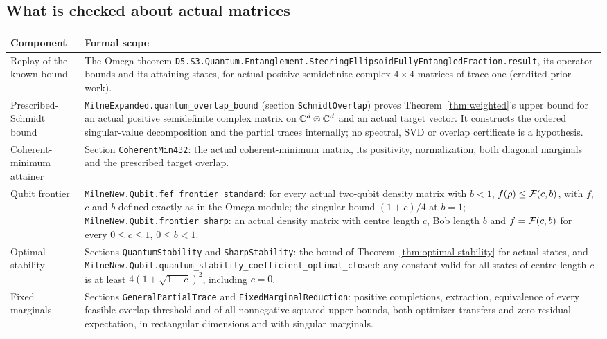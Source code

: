 \subsection{What is checked about actual matrices}
\begin{center}\small
\begin{longtable}{p{}p{}}
\toprule
Component & Formal scope\\\midrule\endhead
Replay of the known bound & The Omega theorem
\nolinkurl{D5.S3.Quantum.Entanglement.SteeringEllipsoidFullyEntangledFraction.result},
its operator bounds and its attaining states, for actual positive
semidefinite complex $4\times4$ matrices of trace one (credited prior
work).\\
Prescribed-Schmidt bound & \nolinkurl{MilneExpanded.quantum_overlap_bound}
(section \texttt{SchmidtOverlap}) proves Theorem~\ref{thm:weighted}'s upper
bound for an actual positive semidefinite complex matrix on
$\mathbb C^d\otimes\mathbb C^d$ and an actual target vector. It constructs the ordered
singular-value decomposition and the partial traces internally; no
spectral, SVD or overlap certificate is a hypothesis.\\
Coherent-minimum attainer & Section \texttt{CoherentMin432}: the actual
coherent-minimum matrix, its positivity, normalization, both diagonal
marginals and the prescribed target overlap.\\
Qubit frontier & \nolinkurl{MilneNew.Qubit.fef_frontier_standard}: for every
actual two-qubit density matrix with $b<1$,
$f(\rho)\le\mathcal F(c,b)$, with $f$, $c$ and $b$ defined exactly as in the Omega
module; the singular bound $(1+c)/4$ at $b=1$;
\nolinkurl{MilneNew.Qubit.frontier_sharp}: an actual density matrix with
centre length $c$, Bob length $b$ and $f=\mathcal F(c,b)$ for every
$0\le c\le1$, $0\le b<1$.\\
Optimal stability & Sections \texttt{QuantumStability} and
\texttt{SharpStability}: the bound of Theorem~\ref{thm:optimal-stability}
for actual states, and
\nolinkurl{MilneNew.Qubit.quantum_stability_coefficient_optimal_closed}: any
constant valid for all states of centre length $c$ is at least
$4(1+\sqrt{1-c})^2$, including $c=0$.\\
Fixed marginals & Sections \texttt{GeneralPartialTrace} and
\texttt{FixedMarginalReduction}: positive completions, extraction,
equivalence of every feasible overlap threshold and of all nonnegative
squared upper bounds, both optimizer transfers and zero residual
expectation, in rectangular dimensions and with singular marginals.\\

\end{longtable}
\end{center}
